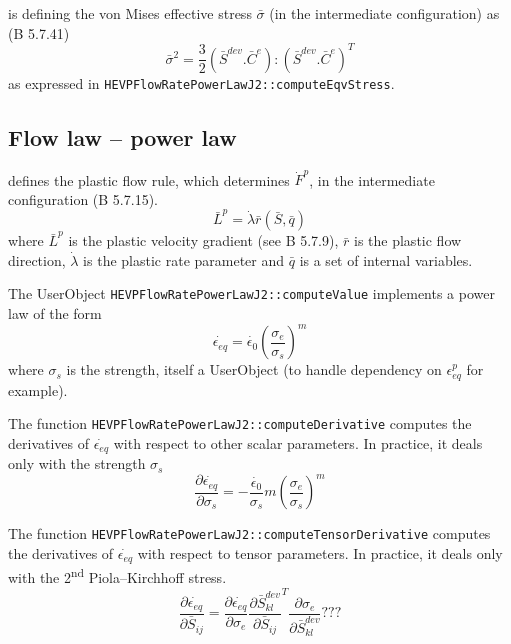 \documentclass[]{scrreprt}
\begin{document}
\citet{Belytschko2014} is defining the von Mises effective stress $\bar{\sigma}$ (in the intermediate configuration) as (B 5.7.41)
\begin{equation}
	\bar{\sigma}^2=\frac{3}{2}\left( \bar{S}^{dev}.\bar{C}^e \right):\left( \bar{S}^{dev}.\bar{C}^e \right)^T
\end{equation}
as expressed in \texttt{HEVPFlowRatePowerLawJ2::computeEqvStress}.

\subsection{Flow law -- power law}
\citet{Belytschko2014} defines the plastic flow rule, which determines $\dot{F}^p$, in the intermediate configuration (B 5.7.15).
\begin{equation}
  \bar{L}^p=\dot{\lambda}\bar{r}(\bar{S},\bar{q})
\end{equation}
where $\bar{L}^p$ is the plastic velocity gradient (see B 5.7.9), $\bar{r}$ is the plastic flow direction, $\dot{\lambda}$ is the plastic rate parameter and $\bar{q}$ is a set of internal variables.

The UserObject \texttt{HEVPFlowRatePowerLawJ2::computeValue} implements a power law of the form
\begin{equation}
  \dot{\epsilon_{eq}} = \dot{\epsilon_0} \left( \frac{\sigma_{e}}{\sigma_s} \right)^m
\end{equation}
where $\sigma_s$ is the strength, itself a UserObject (to handle dependency on $\epsilon^p_{eq}$ for example).

The function \texttt{HEVPFlowRatePowerLawJ2::computeDerivative} computes the derivatives of $\dot{\epsilon_{eq}}$ with respect to other scalar parameters. In practice, it deals only with the strength $\sigma_s$
\begin{equation}
  \frac{\partial \dot{\epsilon_{eq}}}{\partial \sigma_s} = - \frac{\dot{\epsilon_0}}{\sigma_s}m \left( \frac{\sigma_{e}}{\sigma_s} \right)^m
\end{equation}

The function \texttt{HEVPFlowRatePowerLawJ2::computeTensorDerivative} computes the derivatives of $\dot{\epsilon_{eq}}$ with respect to tensor parameters. In practice, it deals only with the 2\textsuperscript{nd} Piola--Kirchhoff stress.
\begin{equation}
  \frac{\partial \dot{\epsilon_{eq}}}{\partial \bar{S}_{ij}} =
  	\frac{\partial \dot{\epsilon_{eq}}}{\partial \sigma_e}
  	\frac{\partial \bar{S}^{dev}_{kl}}{\partial \bar{S}_{ij}}^T
  	\frac{\partial \sigma_e}{\partial \bar{S}^{dev}_{kl}} 
  	???
\end{equation}
\end{document}
